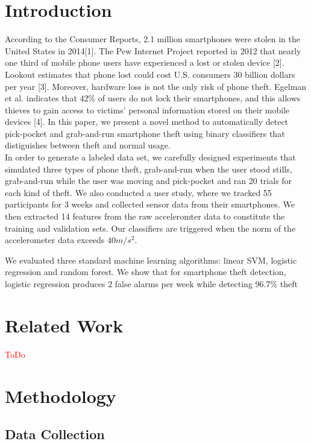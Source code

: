 \section{Introduction}

According to the Consumer Reports, 2.1 million smartphones were stolen in the United States in 2014[1]. The Pew Internet Project reported in 2012 that nearly one third of mobile phone users have experienced a lost or stolen device [2]. Lookout estimates that phone lost could cost U.S. consumers 30 billion dollars per year [3]. Moreover, hardware loss is not the only risk of phone theft. Egelman et al. indicates that $42\%$ of users do not lock their smartphones, and this allows thieves to gain access to victims' personal information stored on their mobile devices [4]. In this paper, we present a novel method to automatically detect pick-pocket and grab-and-run smartphone theft using binary classifiers that distiguishes between theft and normal usage. \\

In order to generate a labeled data set, we carefully designed experiments that simulated three types of phone theft, grab-and-run when the user stood stills, grab-and-run while the user was moving and pick-pocket and ran 20 trials for each kind of theft. We also conducted a user study, where we tracked 55 participants for 3 weeks and collected sensor data from their smartphones. We then extracted 14 features from the raw acceleromter data to constitute the training and validation sets. Our classifiers are triggered when the norm of the accelerometer data exceeds $40m/s^2$.

We evaluated three standard machine learning algorithms: linear SVM, logistic regression and random forest. We show that for smartphone theft detection, logistic regression produces 2 false alarms per week while detecting 96.7\% theft


\section{Related Work}
\textcolor{red}{ToDo} \\


\section{Methodology}

\subsection{Data Collection}

